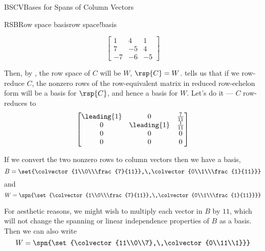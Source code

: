 \begin{subsect}{BSCV}{Bases for Spans of Column Vectors}
\begin{example}{RSB}{Row space basis}{row space!basis}
\begin{para}
\begin{equation*}
\begin{bmatrix}
1 & 4 & 1\\
7 & -5 & 4\\
-7 & -6 & -5
\end{bmatrix}
\end{equation*}
\end{para}
%
\begin{para}Then, by , the row space of $C$ will be $W$, $\rsp{C}=W$.
 tells us that if we row-reduce $C$, the nonzero rows of the row-equivalent matrix in reduced row-echelon form will be a basis for $\rsp{C}$, and hence a basis for $W$.  Let's do it --- $C$ row-reduces to
%
\begin{equation*}
\begin{bmatrix}
\leading{1} & 0 & \frac{7}{11}\\
0 & \leading{1} & \frac{1}{11}\\
0 & 0 & 0\\
0 & 0 & 0
\end{bmatrix}
\end{equation*}
\end{para}
%
\begin{para}If we convert the two nonzero rows to column vectors then we have a basis,
%
\begin{equation*}
B=\set{\colvector{1\\0\\\frac{7}{11}},\,\colvector{0\\1\\\frac{1}{11}}}
\end{equation*}
%
and
%
\begin{equation*}
W=\spn{\set{\colvector{1\\0\\\frac{7}{11}},\,\colvector{0\\1\\\frac{1}{11}}}}
\end{equation*}
\end{para}
%
\begin{para}For aesthetic reasons, we might wish to multiply each vector in $B$ by $11$, which will not change the spanning or linear independence properties of $B$ as a basis.  Then we can also write
%
\begin{equation*}
W=\spn{\set{\colvector{11\\0\\7},\,\colvector{0\\11\\1}}}
\end{equation*}
\end{para}

\end{example}
\end{subsect}
